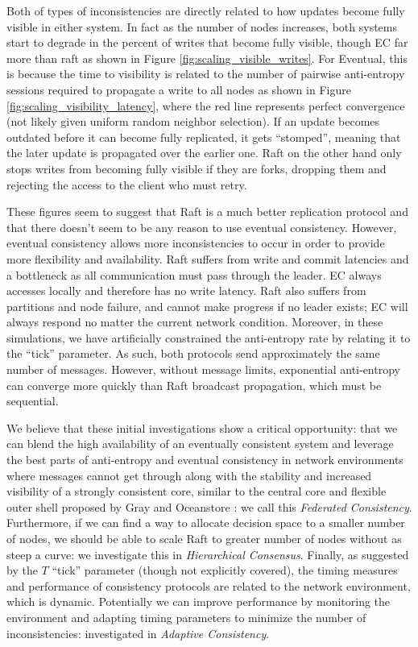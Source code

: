 \documentclass{article}
\begin{document}
Both of types of inconsistencies are directly related to how updates become fully visible in either system. In fact as the number of nodes increases, both systems start to degrade in the percent of writes that become fully visible, though EC far more than raft as shown in Figure \ref{fig:scaling_visible_writes}. For Eventual, this is because the time to visibility is related to the number of pairwise anti-entropy sessions required to propagate a write to all nodes as shown in Figure \ref{fig:scaling_visibility_latency}, where the red line represents perfect convergence (not likely given uniform random neighbor selection). If an update becomes outdated before it can become fully replicated, it gets ``stomped'', meaning that the later update is propagated over the earlier one. Raft on the other hand only stops writes from becoming fully visible if they are forks, dropping them and rejecting the access to the client who must retry.

These figures seem to suggest that Raft is a much better replication protocol and that there doesn't seem to be any reason to use eventual consistency. However, eventual consistency allows more inconsistencies to occur in order to provide more flexibility and availability. Raft suffers from write and commit latencies and a bottleneck as all communication must pass through the leader. EC always accesses locally and therefore has no write latency. Raft also suffers from partitions and node failure, and cannot make progress if no leader exists; EC will always respond no matter the current network condition. Moreover, in these simulations, we have artificially constrained the anti-entropy rate by relating it to the ``tick'' parameter. As such, both protocols send approximately the same number of messages. However, without message limits, exponential anti-entropy can converge more quickly than Raft broadcast propagation, which must be sequential.

We believe that these initial investigations show a critical opportunity: that we can blend the high availability of an eventually consistent system and leverage the best parts of anti-entropy and eventual consistency in network environments where messages cannot get through along with the stability and increased visibility of a strongly consistent core, similar to the central core and flexible outer shell proposed by Gray and Oceanstore \cite{gray_dangers_1996,kubiatowicz_oceanstore:_2000}: we call this \textit{Federated Consistency}. Furthermore, if we can find a way to allocate decision space to a smaller number of nodes, we should be able to scale Raft to greater number of nodes without as steep a curve: we investigate this in \textit{Hierarchical Consensus}. Finally, as suggested by the $T$ ``tick'' parameter (though not explicitly covered), the timing measures and performance of consistency protocols are related to the network environment, which is dynamic. Potentially we can improve performance by monitoring the environment and adapting timing parameters to minimize the number of inconsistencies: investigated in \textit{Adaptive Consistency}.
\end{document}
